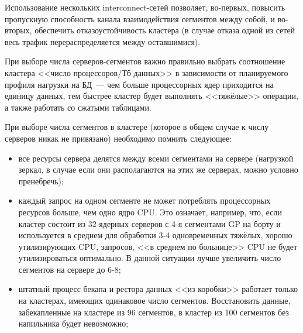 Использование нескольких interconnect-сетей позволяет, во-первых, повысить пропускную способность канала взаимодействия сегментов между собой, и во-вторых, обеспечить отказоустойчивость кластера (в случае отказа одной из сетей весь трафик перераспределяется между оставшимися).

При выборе числа серверов-сегментов важно правильно выбрать соотношение кластера <<число процессоров/Тб данных>> в зависимости от планируемого профиля нагрузки на БД~--- чем больше процессорных ядер приходится на единицу данных, тем быстрее кластер будет выполнять <<тяжёлые>> операции, а также работать со сжатыми таблицами.

При выборе числа сегментов в кластере (которое в общем случае к числу серверов никак не привязано) необходимо помнить следующее:

\begin{itemize}
  \item все ресурсы сервера делятся между всеми сегментами на сервере (нагрузкой зеркал, в случае если они располагаются на этих же серверах, можно условно пренебречь);
  \item каждый запрос на одном сегменте не может потреблять процессорных ресурсов больше, чем одно ядро CPU. Это означает, например, что, если кластер состоит из 32-ядерных серверов с 4-я сегментами GP на борту и используется в среднем для обработки 3-4 одновременных тяжёлых, хорошо утилизирующих CPU, запросов, <<в среднем по больнице>> CPU не будет утилизироваться оптимально. В данной ситуации лучше увеличить число сегментов на сервере до 6-8;
  \item штатный процесс бекапа и рестора данных <<из коробки>> работает только на кластерах, имеющих одинаковое число сегментов. Восстановить данные, забекапленные на кластере из 96 сегментов, в кластер из 100 сегментов без напильника будет невозможно;
\end{itemize}
